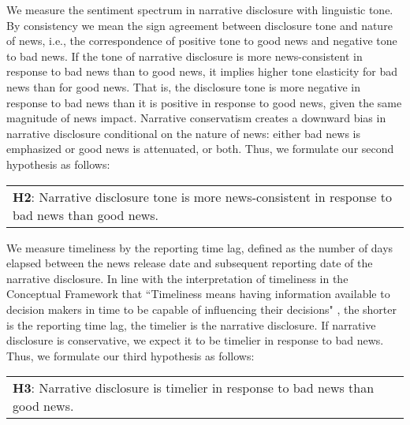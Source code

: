 \documentclass[a4paper]{article}
\begin{document}
\begin{spacing}{2}
We measure the sentiment spectrum in narrative disclosure with linguistic tone. By consistency we mean the sign agreement between disclosure tone and nature of news, i.e., the correspondence of positive tone to good news and negative tone to bad news. If the tone of narrative disclosure is more news-consistent in response to bad news than to good news, it implies higher tone elasticity for bad news than for good news. That is, the disclosure tone is more negative in response to bad news than it is positive in response to good news, given the same magnitude of news impact. Narrative conservatism creates a downward bias in narrative disclosure conditional on the nature of news: either bad news is emphasized or good news is attenuated, or both. Thus, we formulate our second hypothesis as follows:

\begin{center}
	\begin{tabular}{l}
		\textbf{H2}: Narrative disclosure tone is more news-consistent in response to bad news than good news.
	\end{tabular}
\end{center}

We measure timeliness by the reporting time lag, defined as the number of days elapsed between the news release date and subsequent reporting date of the narrative disclosure. In line with the interpretation of timeliness in the Conceptual Framework that ``Timeliness means having information available to decision makers in time to be capable of influencing their decisions" \citep*[QC29]{fasbConceptualFrameworkFinancial2018}, the shorter is the reporting time lag, the timelier is the narrative disclosure. If narrative disclosure is conservative, we expect it to be timelier in response to bad news. Thus, we formulate our third hypothesis as follows:

\begin{center}
	\begin{tabular}{l}
		\textbf{H3}: Narrative disclosure is timelier in response to bad news than good news.
	\end{tabular}
\end{center}


\end{spacing}
\end{document}
